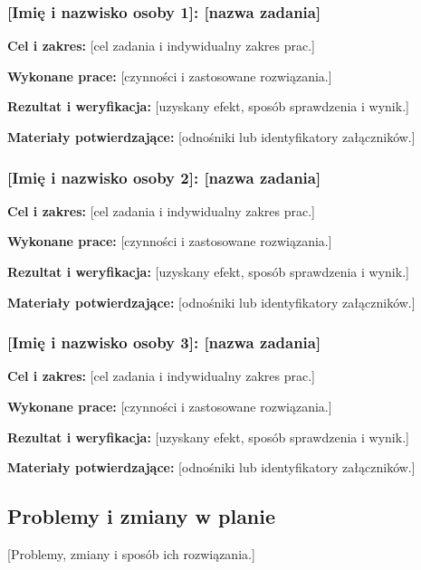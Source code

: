 \documentclass[11pt,a4paper,oneside]{article}
\newif\ifpodpowiedzi
\newcommand{\podpowiedz}[1]{\ifpodpowiedzi\par\begingroup\small\color{hintcolor}\textit{Wskazówka: #1}\par\endgroup\fi}
\newcommand{\pole}[1]{\textnormal{[#1]}}
\newcommand{\studentA}{\pole{Imię i nazwisko osoby 1}}
\newcommand{\studentB}{\pole{Imię i nazwisko osoby 2}}
\newcommand{\studentC}{\pole{Imię i nazwisko osoby 3}}
\begin{document}
\subsubsection{\studentA: \pole{nazwa zadania}}\label{zadanie-a}
\textbf{Cel i zakres:} \pole{cel zadania i indywidualny zakres prac.}\par
\textbf{Wykonane prace:} \pole{czynności i zastosowane rozwiązania.}\par
\textbf{Rezultat i weryfikacja:} \pole{uzyskany efekt, sposób sprawdzenia i wynik.}\par
\textbf{Materiały potwierdzające:} \pole{odnośniki lub identyfikatory załączników.}

\subsubsection{\studentB: \pole{nazwa zadania}}\label{zadanie-b}
\textbf{Cel i zakres:} \pole{cel zadania i indywidualny zakres prac.}\par
\textbf{Wykonane prace:} \pole{czynności i zastosowane rozwiązania.}\par
\textbf{Rezultat i weryfikacja:} \pole{uzyskany efekt, sposób sprawdzenia i wynik.}\par
\textbf{Materiały potwierdzające:} \pole{odnośniki lub identyfikatory załączników.}

\subsubsection{\studentC: \pole{nazwa zadania}}\label{zadanie-c}
\textbf{Cel i zakres:} \pole{cel zadania i indywidualny zakres prac.}\par
\textbf{Wykonane prace:} \pole{czynności i zastosowane rozwiązania.}\par
\textbf{Rezultat i weryfikacja:} \pole{uzyskany efekt, sposób sprawdzenia i wynik.}\par
\textbf{Materiały potwierdzające:} \pole{odnośniki lub identyfikatory załączników.}

\subsection{Problemy i zmiany w planie}
\podpowiedz{Wskaż trudności, przyczyny opóźnień, wpływ na harmonogram oraz podjęte lub proponowane działania. Odnotuj istotne zmiany zakresu uzgodnione z prowadzącymi. Jeśli nie wystąpiły problemy ani zmiany, napisz to wprost.}
\pole{Problemy, zmiany i sposób ich rozwiązania.}
\end{document}

